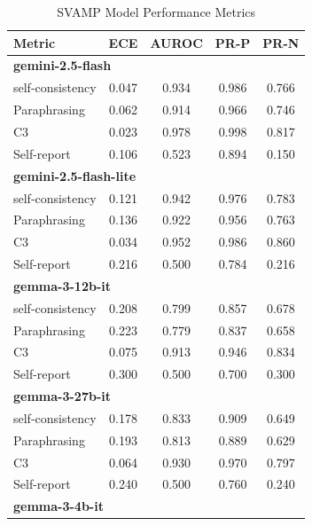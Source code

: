 \documentclass[11pt]{article}
\theoremstyle{plain}
\theoremstyle{definition}
\theoremstyle{remark}
\begin{document}
\begin{table}[p]
\centering
\caption{SVAMP Model Performance Metrics}
\label{tab:svamp-metrics}
\scriptsize
\begin{minipage}[t]{0.48\textwidth}
    \centering
    \begin{tabular}{lcccc}
        \toprule
        \textbf{Metric} & \textbf{ECE} & \textbf{AUROC} & \textbf{PR-P} & \textbf{PR-N} \\
        \midrule
        \multicolumn{5}{l}{\textbf{gemini-2.5-flash}} \\
        self-consistency & 0.047 & 0.934 & 0.986 & 0.766 \\
        Paraphrasing     & 0.062 & 0.914 & 0.966 & 0.746 \\
       C3             & 0.023 & 0.978 & 0.998 & 0.817 \\
        Self-report      & 0.106 & 0.523 & 0.894 & 0.150 \\
        \midrule
        \multicolumn{5}{l}{\textbf{gemini-2.5-flash-lite}} \\
        self-consistency & 0.121 & 0.942 & 0.976 & 0.783 \\
        Paraphrasing     & 0.136 & 0.922 & 0.956 & 0.763 \\
       C3             & 0.034 & 0.952 & 0.986 & 0.860 \\
        Self-report      & 0.216 & 0.500 & 0.784 & 0.216 \\
        \midrule
        \multicolumn{5}{l}{\textbf{gemma-3-12b-it}} \\
        self-consistency & 0.208 & 0.799 & 0.857 & 0.678 \\
        Paraphrasing     & 0.223 & 0.779 & 0.837 & 0.658 \\
       C3             & 0.075 & 0.913 & 0.946 & 0.834 \\
        Self-report      & 0.300 & 0.500 & 0.700 & 0.300 \\
        \midrule
        \multicolumn{5}{l}{\textbf{gemma-3-27b-it}} \\
        self-consistency & 0.178 & 0.833 & 0.909 & 0.649 \\
        Paraphrasing     & 0.193 & 0.813 & 0.889 & 0.629 \\
       C3             & 0.064 & 0.930 & 0.970 & 0.797 \\
        Self-report      & 0.240 & 0.500 & 0.760 & 0.240 \\
        \midrule
        \multicolumn{5}{l}{\textbf{gemma-3-4b-it}} \\

\end{tabular}
\end{minipage}
\end{table}
\end{document}
